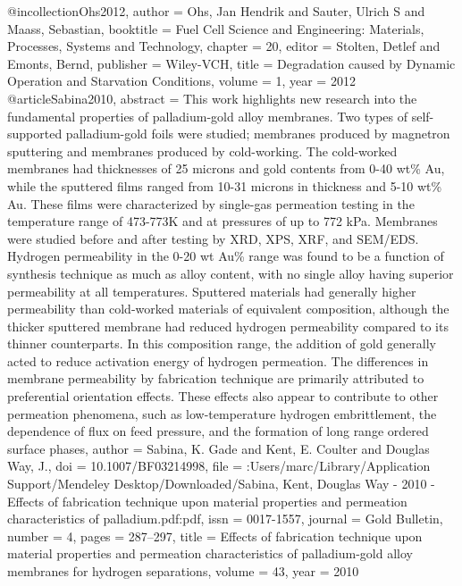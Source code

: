 @incollection{Ohs2012,
author = {Ohs, Jan Hendrik and Sauter, Ulrich S and Maass, Sebastian},
booktitle = {Fuel Cell Science and Engineering: Materials, Processes, Systems and Technology},
chapter = {20},
editor = {Stolten, Detlef and Emonts, Bernd},
publisher = {Wiley-VCH},
title = {{Degradation caused by Dynamic Operation and Starvation Conditions}},
volume = {1},
year = {2012}
}
@article{Sabina2010,
abstract = {This work highlights new research into the fundamental properties of palladium-gold alloy membranes. Two types of self-supported palladium-gold foils were studied; membranes produced by magnetron sputtering and membranes produced by cold-working. The cold-worked membranes had thicknesses of 25 microns and gold contents from 0-40 wt{\%} Au, while the sputtered films ranged from 10-31 microns in thickness and 5-10 wt{\%} Au. These films were characterized by single-gas permeation testing in the temperature range of 473-773K and at pressures of up to 772 kPa. Membranes were studied before and after testing by XRD, XPS, XRF, and SEM/EDS. Hydrogen permeability in the 0-20 wt Au{\%} range was found to be a function of synthesis technique as much as alloy content, with no single alloy having superior permeability at all temperatures. Sputtered materials had generally higher permeability than cold-worked materials of equivalent composition, although the thicker sputtered membrane had reduced hydrogen permeability compared to its thinner counterparts. In this composition range, the addition of gold generally acted to reduce activation energy of hydrogen permeation. The differences in membrane permeability by fabrication technique are primarily attributed to preferential orientation effects. These effects also appear to contribute to other permeation phenomena, such as low-temperature hydrogen embrittlement, the dependence of flux on feed pressure, and the formation of long range ordered surface phases},
author = {Sabina, K. Gade and Kent, E. Coulter and {Douglas Way}, J.},
doi = {10.1007/BF03214998},
file = {:Users/marc/Library/Application Support/Mendeley Desktop/Downloaded/Sabina, Kent, Douglas Way - 2010 - Effects of fabrication technique upon material properties and permeation characteristics of palladium.pdf:pdf},
issn = {0017-1557},
journal = {Gold Bulletin},
number = {4},
pages = {287--297},
title = {{Effects of fabrication technique upon material properties and permeation characteristics of palladium-gold alloy membranes for hydrogen separations}},
volume = {43},
year = {2010}
}
